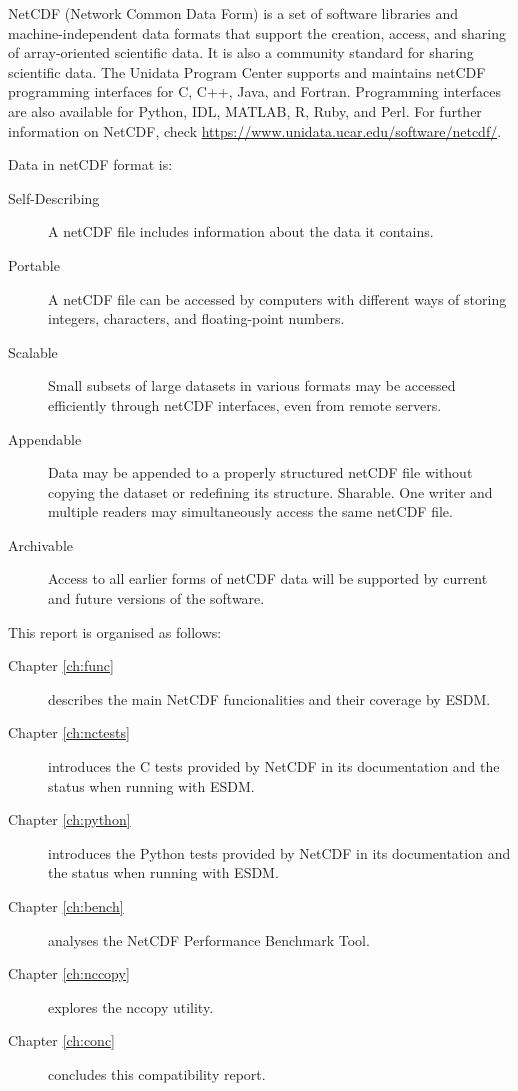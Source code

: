 NetCDF (Network Common Data Form) is a set of software libraries and machine-independent data formats that support the creation, access, and sharing of array-oriented scientific data. It is also a community standard for sharing scientific data. The Unidata Program Center supports and maintains netCDF programming interfaces for C, C++, Java, and Fortran. Programming interfaces are also available for Python, IDL, MATLAB, R, Ruby, and Perl. For further information on NetCDF, check \url{https://www.unidata.ucar.edu/software/netcdf/}.

Data in netCDF format is:

\begin{description}

\item[Self-Describing] A netCDF file includes information about the data it contains.

\item[Portable] A netCDF file can be accessed by computers with different ways of storing integers, characters, and floating-point numbers.

\item[Scalable] Small subsets of large datasets in various formats may be accessed efficiently through netCDF interfaces, even from remote servers.

\item[Appendable] Data may be appended to a properly structured netCDF file without copying the dataset or redefining its structure.
Sharable. One writer and multiple readers may simultaneously access the same netCDF file.

\item[Archivable] Access to all earlier forms of netCDF data will be supported by current and future versions of the software.

\end{description}

This report is organised as follows:

\begin{description}

\item[Chapter \ref{ch:func}] describes the main NetCDF funcionalities and their coverage by ESDM.

\item[Chapter \ref{ch:nctests}] introduces the C tests provided by NetCDF in its documentation and the status when running with ESDM.

\item[Chapter \ref{ch:python}] introduces the Python tests provided by NetCDF in its documentation and the status when running with ESDM.

\item[Chapter \ref{ch:bench}] analyses the NetCDF Performance Benchmark Tool.

\item[Chapter \ref{ch:nccopy}] explores the nccopy utility.

\item[Chapter \ref{ch:conc}] concludes this compatibility report.

\end{description}

